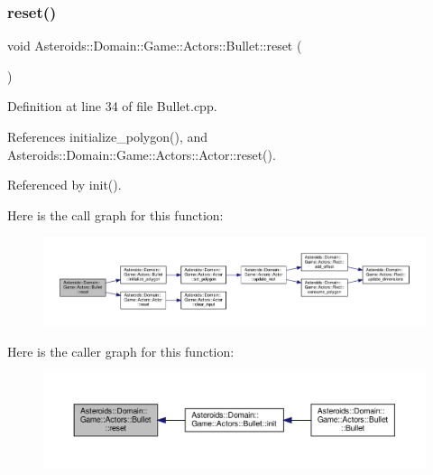 \subsubsection{\texorpdfstring{reset()}{reset()}}
{\footnotesize\ttfamily void Asteroids\+::\+Domain\+::\+Game\+::\+Actors\+::\+Bullet\+::reset (\begin{DoxyParamCaption}{ }\end{DoxyParamCaption})}



Definition at line 34 of file Bullet.\+cpp.



References initialize\+\_\+polygon(), and Asteroids\+::\+Domain\+::\+Game\+::\+Actors\+::\+Actor\+::reset().



Referenced by init().

Here is the call graph for this function\+:\nopagebreak
\begin{figure}[H]
\begin{center}
\leavevmode
\includegraphics[width=350pt]{classAsteroids_1_1Domain_1_1Game_1_1Actors_1_1Bullet_ae3837ed471d290688f684e8187e6865e_cgraph}
\end{center}
\end{figure}
Here is the caller graph for this function\+:\nopagebreak
\begin{figure}[H]
\begin{center}
\leavevmode
\includegraphics[width=350pt]{classAsteroids_1_1Domain_1_1Game_1_1Actors_1_1Bullet_ae3837ed471d290688f684e8187e6865e_icgraph}
\end{center}
\end{figure}
\mbox{\label{classAsteroids_1_1Domain_1_1Game_1_1Actors_1_1Bullet_a06eb5b7aa30c8547159696c82fd2f642}} 

